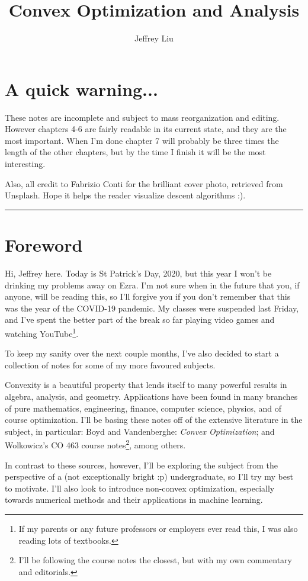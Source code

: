 \documentclass[11pt]{article}
\title{Convex Optimization and Analysis}
\author{Jeffrey Liu}
\date{}
\numberwithin{equation}{section}
\theoremstyle{definition}
\begin{document}
\BgThispage
\maketitle
\thispagestyle{empty}
\clearpage
\section*{A quick warning...}
These notes are incomplete and subject to mass reorganization and editing. However chapters 4-6 are fairly readable in its current state, and they are the most important. When I'm done chapter 7 will probably be three times the length of the other chapters, but by the time I finish it will be the most interesting.

\vspace{2cm}
\noindent
Also, all credit to Fabrizio Conti for the brilliant cover photo, retrieved from Unsplash. Hope it helps the reader visualize descent algorithms :).
\clearpage
\hrule
\section*{Foreword}
Hi, Jeffrey here. Today is St Patrick's Day, 2020, but this year I won't be  drinking my problems away on Ezra. I'm not sure when in the future that you, if anyone, will be reading this, so I'll forgive you if you don't remember that this was the year of the COVID-19 pandemic. My classes were suspended last Friday, and I've spent the better part of the break so far playing video games and watching YouTube\footnote{If my parents or any future professors or employers ever read this, I was also reading lots of textbooks.}.

To keep my sanity over the next couple months, I've also decided to start a collection of notes for some of my more favoured subjects.

Convexity is a beautiful property that lends itself to many powerful results in algebra, analysis, and geometry. Applications have been found in many branches of pure mathematics, engineering, finance, computer science, physics, and of course optimization. I'll be basing these notes off of the extensive literature in the subject, in particular: Boyd and Vandenberghe: \textit{Convex Optimization}; and Wolkowicz's CO 463 course notes\footnote{I'll be following the course notes the closest, but with my own commentary and editorials.}, among others.

In contrast to these sources, however, I'll be exploring the subject from the perspective of a (not exceptionally bright :p) undergraduate, so I'll try my best to motivate. I'll also look to introduce non-convex optimization, especially towards numerical methods and their applications in machine learning.
\end{document}
